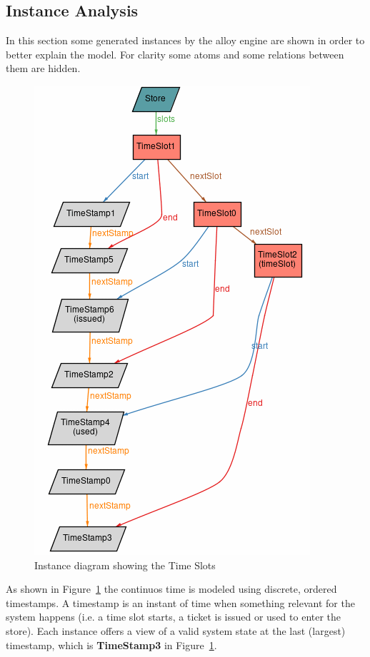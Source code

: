 \subsection{Instance Analysis}
In this section some generated instances by the alloy engine are shown in order to better explain the model.
For clarity some atoms and some relations between them are hidden.
\begin{figure}[H]
    \hspace*{3.0cm}
    \includegraphics[scale=0.9]{Images/alloy_1_slots.png}
    \caption{\label{fig:Alloy_1}Instance diagram showing the Time Slots}
\end{figure}

As shown in Figure~\ref{fig:Alloy_1} the continuos time is modeled using discrete, ordered timestamps. A timestamp is an instant of time when something relevant for the system happens (i.e. a time slot starts, a ticket is issued or used to enter the store). Each instance offers a view of a valid system state at the last (largest) timestamp, which is \textbf{TimeStamp3} in Figure~\ref{fig:Alloy_1}.

